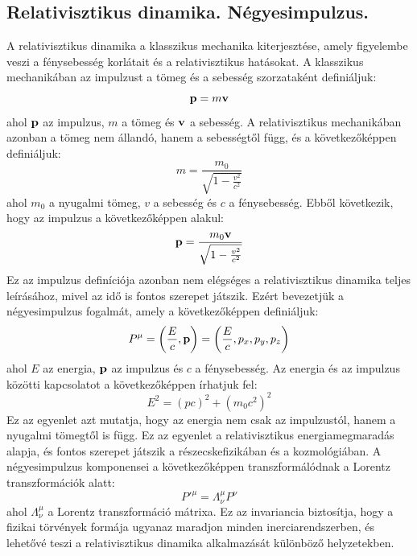 \documentclass[a4paper,12pt]{article}
\begin{document}
\subsection{Relativisztikus dinamika. Négyesimpulzus.}
A relativisztikus dinamika a klasszikus mechanika kiterjesztése, amely figyelembe veszi a fénysebesség korlátait és a relativisztikus hatásokat. A klasszikus mechanikában az impulzust a tömeg és a sebesség szorzataként definiáljuk:
\begin{equation}
    \bold{p} = m \bold{v}
\end{equation}
ahol $\bold{p}$ az impulzus, $m$ a tömeg és $\bold{v}$ a sebesség. A relativisztikus mechanikában azonban a tömeg nem állandó, hanem a sebességtől függ, és a következőképpen definiáljuk:
\begin{equation}
    m = \frac{m_0}{\sqrt{1 - \frac{v^2}{c^2}}}
\end{equation}
ahol $m_0$ a nyugalmi tömeg, $v$ a sebesség és $c$ a fénysebesség. Ebből következik, hogy az impulzus a következőképpen alakul:
\begin{equation}
    \bold{p} = \frac{m_0 \bold{v}}{\sqrt{1 - \frac{v^2}{c^2}}}
\end{equation}
Ez az impulzus definíciója azonban nem elégséges a relativisztikus dinamika teljes leírásához, mivel az idő is fontos szerepet játszik. Ezért bevezetjük a négyesimpulzus fogalmát, amely a következőképpen definiáljuk:
\begin{equation}
    P^\mu = \left(\frac{E}{c}, \bold{p}\right) = \left(\frac{E}{c}, p_x, p_y, p_z\right)
\end{equation}
ahol $E$ az energia, $\bold{p}$ az impulzus és $c$ a fénysebesség. Az energia és az impulzus közötti kapcsolatot a következőképpen írhatjuk fel:
\begin{equation}
    E^2 = (pc)^2 + (m_0 c^2)^2
\end{equation}
Ez az egyenlet azt mutatja, hogy az energia nem csak az impulzustól, hanem a nyugalmi tömegtől is függ. Ez az egyenlet a relativisztikus energiamegmaradás alapja, és fontos szerepet játszik a részecskefizikában és a kozmológiában.
A négyesimpulzus komponensei a következőképpen transzformálódnak a Lorentz transzformációk alatt:
\begin{equation}
    P'^\mu = \Lambda^\mu_\nu P^\nu
\end{equation}
ahol $\Lambda^\mu_\nu$ a Lorentz transzformáció mátrixa. Ez az invariancia biztosítja, hogy a fizikai törvények formája ugyanaz maradjon minden inerciarendszerben, és lehetővé teszi a relativisztikus dinamika alkalmazását különböző helyzetekben.
\end{document}
